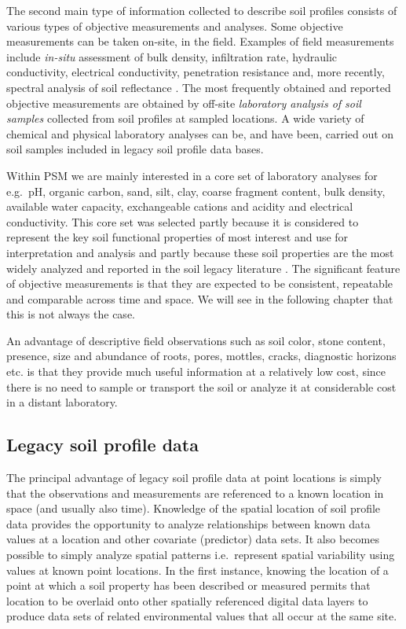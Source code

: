 \documentclass[graybox,natbib,nospthms,UStrade]{svmono}
\let\BeginKnitrBlock\begin \let\EndKnitrBlock\end
\let\BeginKnitrBlock\begin \let\EndKnitrBlock\end
\begin{document}
The second main type of information collected to describe soil profiles
consists of various types of objective measurements and analyses. Some
objective measurements can be taken on-site, in the field. Examples of
field measurements include \emph{in-situ} assessment of bulk density,
infiltration rate, hydraulic conductivity, electrical conductivity,
penetration resistance and, more recently, spectral analysis of soil
reflectance \citep{kondolf2003tools, GehlRice2005, ShepherdWalsh2007JNIS}.
The most frequently obtained and reported objective measurements are
obtained by off-site \emph{laboratory analysis of soil samples} collected
from soil profiles at sampled locations. A wide variety of chemical and
physical laboratory analyses can be, and have been, carried out on soil
samples included in legacy soil profile data bases.

Within PSM we are mainly interested in a core set of laboratory analyses for e.g.~pH,
organic carbon, sand, silt, clay, coarse fragment content, bulk density,
available water capacity, exchangeable cations and acidity and
electrical conductivity. This core set was selected partly because it is
considered to represent the key soil functional properties of most
interest and use for interpretation and analysis and partly because
these soil properties are the most widely analyzed and reported in the
soil legacy literature \citep{Sanchez2009Science, Hartemink2010Springer}.
The significant feature of objective measurements is that they are
expected to be consistent, repeatable and comparable across time and
space. We will see in the following chapter that this is not always the
case.

\BeginKnitrBlock{rmdnote}
An advantage of descriptive field
observations such as soil color, stone content, presence, size and
abundance of roots, pores, mottles, cracks, diagnostic horizons etc. is
that they provide much useful information at a relatively low cost,
since there is no need to sample or transport the soil or analyze it at
considerable cost in a distant laboratory.
\EndKnitrBlock{rmdnote}

\hypertarget{legacy-soil-profile-data}{%
\subsection{Legacy soil profile data}\label{legacy-soil-profile-data}}

The principal advantage of legacy soil profile data at point locations
is simply that the observations and measurements are referenced to a
known location in space (and usually also time). Knowledge of the
spatial location of soil profile data provides the opportunity to
analyze relationships between known data values at a location and other
covariate (predictor) data sets. It also becomes possible to simply
analyze spatial patterns i.e.~represent spatial variability using values
at known point locations. In the first instance, knowing the location of
a point at which a soil property has been described or measured permits
that location to be overlaid onto other spatially referenced digital
data layers to produce data sets of related environmental values that
all occur at the same site.
\end{document}
